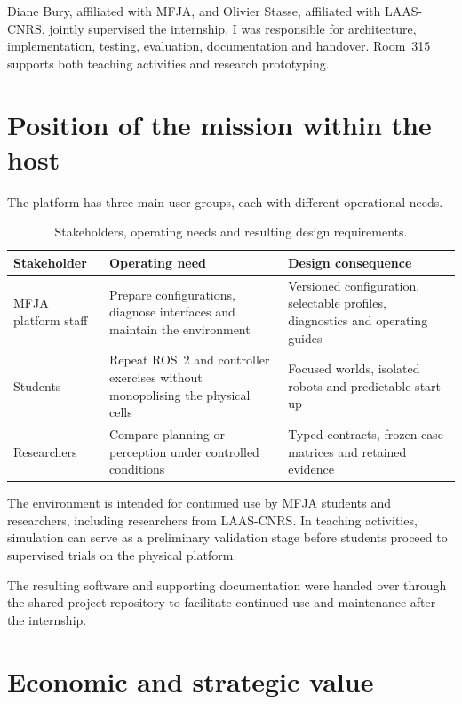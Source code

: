 Diane Bury, affiliated with MFJA, and Olivier Stasse, affiliated with
LAAS-CNRS, jointly supervised the internship. I was responsible for
architecture, implementation, testing, evaluation, documentation and handover.
Room~315 supports both teaching activities and research prototyping.

\pagebreak
\section{Position of the mission within the host}

The platform has three main user groups, each with different operational needs.

\begin{table}[htbp]
\centering
\small
\renewcommand{\arraystretch}{1.12}
\caption{Stakeholders, operating needs and resulting design requirements.}
\label{tab:host-stakeholders}
\begin{tabularx}{\textwidth}{@{}
>{\raggedright\arraybackslash}p{}
>{\raggedright\arraybackslash}p{}
>{\raggedright\arraybackslash}X@{}}
\toprule
\textbf{Stakeholder} & \textbf{Operating need} & \textbf{Design consequence}\\
\midrule
MFJA platform staff & Prepare configurations, diagnose interfaces and maintain
the environment & Versioned configuration, selectable profiles, diagnostics
and operating guides\\ \tablerowrule
Students & Repeat ROS~2 and controller exercises without monopolising the
physical cells & Focused worlds, isolated robots and predictable start-up\\
\tablerowrule
Researchers & Compare planning or perception under controlled conditions &
Typed contracts, frozen case matrices and retained evidence\\
\bottomrule
\end{tabularx}
\end{table}

The environment is intended for continued use by MFJA students and researchers,
including researchers from LAAS-CNRS. In teaching activities, simulation can
serve as a preliminary validation stage before students proceed to supervised
trials on the physical platform.

The resulting software and supporting documentation were handed over through
the shared project repository to facilitate continued use and maintenance after
the internship.

\section{Economic and strategic value}

